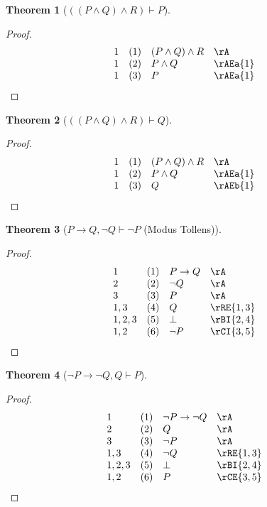 \documentclass{book}
\theoremstyle{plain}
\newtheorem{theorem}{Theorem}
\theoremstyle{remark}
\theoremstyle{definition}
\begin{document}
\label{LpLpPAndQRpAndRRpImpP}
\begin{theorem}[\( ((P \land Q) \land R)\vdash P \)]
\end{theorem}
\begin{proof}
	\[
	\begin{array}{llll}
		1 & (1) & (P \land Q) \land R & \rA \\
		1 & (2) & P\land Q & \rAEa{1} \\
		1 & (3) & P  & \rAEa{1} \\
	\end{array}
	\]
\end{proof}

\label{LpLpPAndQRpAndRRpImpQ}
\begin{theorem}[\( ((P \land Q) \land R)\vdash Q \)]
\end{theorem}
\begin{proof}
	\[
	\begin{array}{llll}
		1 & (1) & (P \land Q) \land R & \rA \\
		1 & (2) & P\land Q & \rAEa{1} \\
		1 & (3) & Q  & \rAEb{1} \\
	\end{array}
	\]
\end{proof}


\label{PToQwnQImpnP}
\begin{theorem}[\(P \rightarrow Q, \neg Q \vdash \neg P\) (Modus Tollens)]
\end{theorem}
\begin{proof}
	\[
	\begin{array}{llll}
		1 & (1) & P \rightarrow Q & \rA \\
		2 & (2) & \neg Q & \rA \\
		3 & (3) & P & \rA \\
		1,3 & (4) & Q & \rRE{1,3} \\
		1,2,3 & (5) & \bot & \rBI{2,4} \\
		1,2 & (6) & \neg P & \rCI{3,5}\\
	\end{array}
	\]
\end{proof}

\label{nPTonQwQImpP}
\begin{theorem}[\(\neg P \rightarrow \neg Q, Q \vdash P\)]
\end{theorem}
\begin{proof}		
	\[
	\begin{array}{llll}
		1 & (1) & \neg P \rightarrow \neg Q & \rA \\
		2 & (2) & Q & \rA \\
		3 & (3) & \neg P & \rA \\
		1,3 & (4) & \neg Q & \rRE{1,3} \\
		1,2,3 & (5) & \bot & \rBI{2,4} \\
		1,2 & (6) & P & \rCE{3,5} \\
	\end{array}
	\]
\end{proof}
\end{document}

